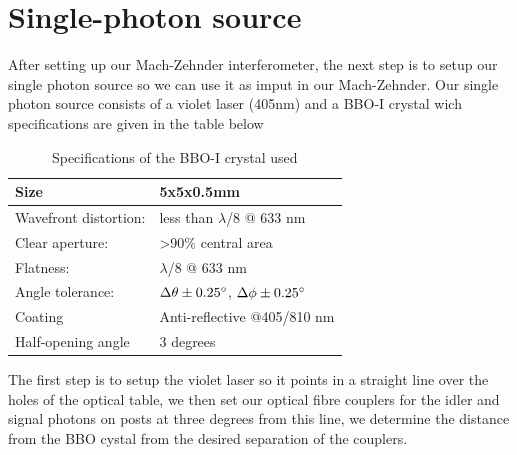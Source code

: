 \documentclass[12pt]{book}
\begin{document}
\section{Single-photon source}

After setting up our Mach-Zehnder interferometer, the next step is to setup our  single photon source so we can use it as imput in our Mach-Zehnder. Our single photon source consists of a violet laser (405nm) and a BBO-I crystal wich specifications are given in the table below

\begin{table}[H]
\center
\begin{tabular}{|l|l|}
\hline
Size                  & 5x5x0.5mm    \\ \hline
Wavefront distortion: & less than $\lambda$/8 @ 633 nm  \\ \hline
Clear aperture:       & \textgreater 90\% central area  \\ \hline
Flatness:             & $\lambda$/8 @ 633 nm            \\ \hline
Angle tolerance:      & $\Delta \theta\pm 0.25\degree$,     $\Delta \phi\pm 0.25\degree$  \\ \hline
Coating               & Anti-reflective @405/810 nm \\ \hline
Half-opening angle    & 3 degrees   \\ \hline
\end{tabular}
\caption{Specifications of the BBO-I crystal used}
\end{table}

The first step is to setup the violet laser so it points in a straight line over the holes of the optical table, we then set our optical fibre couplers for the idler and signal photons on posts at three degrees from this line, we determine the distance from the BBO cystal from the desired separation of the couplers.
\end{document}
